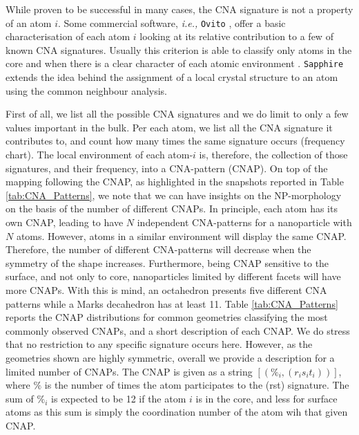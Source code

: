 While proven to be successful in many cases, the CNA signature is not a property of an atom $i$.
Some commercial software, \textit{i.e.,} \texttt{Ovito} \cite{ovito}, offer a basic characterisation of each atom $i$ looking at its relative contribution to a few of known CNA signatures. Usually this criterion is able to classify only atoms in the core and when there is a clear character of each atomic environment \cite{Stukowski_2012}.
%
\texttt{Sapphire} extends the idea behind the assignment of a local crystal structure to an atom using the common neighbour analysis.

First of all, we list all the possible CNA signatures and we do limit to only a few values important in the bulk.
Per each atom, we list all the CNA signature it contributes to, and count how many times the same signature occurs (frequency chart).
The local environment of each atom-$i$ is, therefore, the collection of those signatures, and their frequency, into a CNA-pattern (CNAP). On top of the mapping following the CNAP, as highlighted in the snapshots reported in Table \ref{tab:CNA_Patterns}, we note that we can have insights on the NP-morphology on the basis of the number of different CNAPs.
%
In principle, each atom has its own CNAP, leading to have $N$ independent CNA-patterns for a nanoparticle with $N$ atoms. However, atoms in a similar environment will display the same CNAP. Therefore, the number of different CNA-patterns will decrease when the symmetry of the shape increases. Furthermore, being CNAP sensitive to the surface, and not only to core, nanoparticles limited by different facets will have more CNAPs. With this is mind, an octahedron presents five different CNA patterns while a Marks decahedron has at least 11. 
%
Table \ref{tab:CNA_Patterns} reports the CNAP distributions for common geometries classifying the most commonly observed CNAPs, and a short description of each CNAP. We do stress that no restriction to any specific signature occurs here. However, as the geometries shown are highly symmetric, overall we provide a description for a limited number of CNAPs. The CNAP is given as a string $[(\%_i,(r_is_it_i))]$, where $\%$ is the number of times the atom participates to the (rst) signature. The sum of $\%_i$ is expected to be 12 if the atom $i$ is in the core, and less for surface atoms as this sum is simply the coordination number of the atom wih that given CNAP.
%
